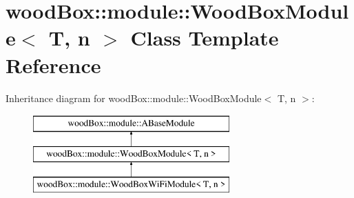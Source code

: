 \hypertarget{classwood_box_1_1module_1_1_wood_box_module}{}\section{wood\+Box\+:\+:module\+:\+:Wood\+Box\+Module$<$ T, n $>$ Class Template Reference}
\label{classwood_box_1_1module_1_1_wood_box_module}
Inheritance diagram for wood\+Box\+:\+:module\+:\+:Wood\+Box\+Module$<$ T, n $>$\+:\begin{figure}[H]
\begin{center}
\leavevmode
\includegraphics[height=3.000000cm]{classwood_box_1_1module_1_1_wood_box_module}
\end{center}
\end{figure}
